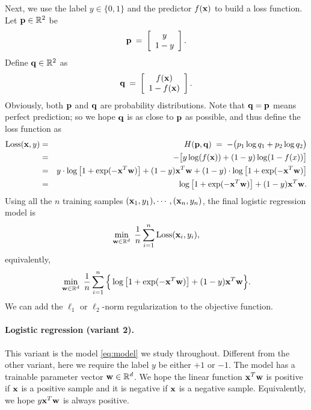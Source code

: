 \documentclass[11pt]{article}
\numberwithin{equation}{section}
\def\pp{{\bf p}}
\def\q{{\bf q}}
\def\w{{\bf w}}
\def\x{{\bf x}}
\def\RB{{\mathbb R}}
\begin{document}
Next, we use the label $y \in \{0, 1\}$ and the predictor $f (\x)$ to build a loss function.
Let $\pp \in \RB^{2}$ be 
\begin{equation*}
\pp \: = \: 
\left[
\begin{array}{c}
y \\
1-y \\
\end{array}
\right].
\end{equation*}
Define $\q \in \RB^2$ as
\begin{equation*}
\q \: = \: 
\left[
\begin{array}{c}
f (\x) \\
1 - f (\x) \\
\end{array}
\right] .
\end{equation*}
Obviously, both $\pp$ and $\q$ are probability distributions.
Note that $\q = \pp$ means perfect prediction;
so we hope $\q$ is as close to $\pp$ as possible, and thus define the loss function as
\begin{eqnarray*}
\textrm{Loss} (\x, y)
& = & H (\pp , \q )
\; = \; - \big( p_1 \log q_1 + p_2 \log q_2 \big) \\
& = & - \big[ y \log (f(\x)) + (1-y) \log (1-f(x))  \big] \\
& = & y \cdot \log \big[ 1 + \exp (-\x^T \w) \big]
+ (1-y) \x^T \w + (1- y) \cdot \log \big[ 1 + \exp (-\x^T \w)  \big] \\
& = & \log \big[ 1 + \exp (-\x^T \w) \big] + (1-y)  \x^T \w .
\end{eqnarray*}
Using all the $n$ training samples $(\x_1, y_1), \cdots , (\x_n, y_n)$, the final logistic regression model is
\begin{equation*}
\min_{\w \in \RB^d} \; \frac{1}{n} \sum_{i=1}^{n} \textrm{Loss} (\x_i, y_i ) ,
\end{equation*}
equivalently, 
\begin{equation} \label{eq:model1}
\min_{\w \in \RB^d} \; \frac{1}{n} \sum_{i=1}^{n} 
\Big\{ \log \big[ 1 + \exp (-\x^T \w) \big]  + (1-y)  \x^T \w \Big\} .
\end{equation}
We can add the $\ell_1$ or $\ell_2$-norm regularization to the objective function.


\paragraph{Logistic regression (variant 2).}
This variant is the model \eqref{eq:model} we study throughout.
Different from the other variant, here we require the label $y$ be either $+1$ or $-1$.
The model has a trainable parameter vector $\w \in \RB^d$.
We hope the linear function $\x^T \w$ is positive if $\x$ is a positive sample
and it is negative if $\x$ is a negative sample.
Equivalently, we hope $y \x^T \w$ is always positive.
\end{document}
